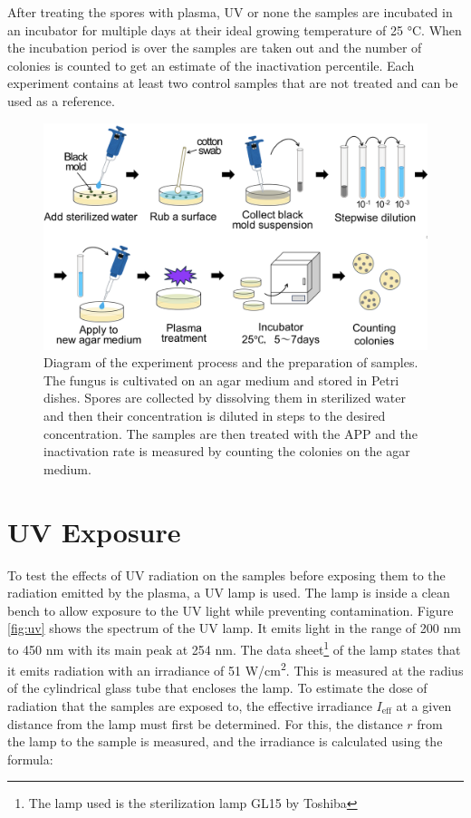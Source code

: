 After treating the spores with plasma, UV or none the samples are incubated in an incubator for multiple days at their ideal growing temperature of 25 °C. When the incubation period is over the samples are taken out and the number of colonies is counted to get an estimate of the inactivation percentile. Each experiment contains at least two control samples that are not treated and can be used as a reference.

\begin{figure}
    \centering
    \includegraphics[width=1\textwidth]{images/Process.png}
    \caption[Diagram of the experiment process]{Diagram of the experiment process and the preparation of samples. The fungus is cultivated on an agar medium and stored in Petri dishes. Spores are collected by dissolving them in sterilized water and then their concentration is diluted in steps to the desired concentration. The samples are then treated with the APP and the inactivation rate is measured by counting the colonies on the agar medium.}
    \label{fig:process}
\end{figure}

\section{UV Exposure}
To test the effects of UV radiation on the samples before exposing them to the radiation emitted by the plasma, a UV lamp is used. The lamp is inside a clean bench to allow exposure to the UV light while preventing contamination. Figure \ref{fig:uv} shows the spectrum of the UV lamp. It emits light in the range of 200 nm to 450 nm with its main peak at 254 nm. The data sheet\footnote{The lamp used is the sterilization lamp \textsc{GL15} by Toshiba} of the lamp states that it emits radiation with an irradiance of 51 \textmu W/cm\textsuperscript{2}. This is measured at the radius of the cylindrical glass tube that encloses the lamp. To estimate the dose of radiation that the samples are exposed to, the effective irradiance $I_\text{eff}$ at a given distance from the lamp must first be determined. For this, the distance $r$ from the lamp to the sample is measured, and the irradiance is calculated using the formula:

